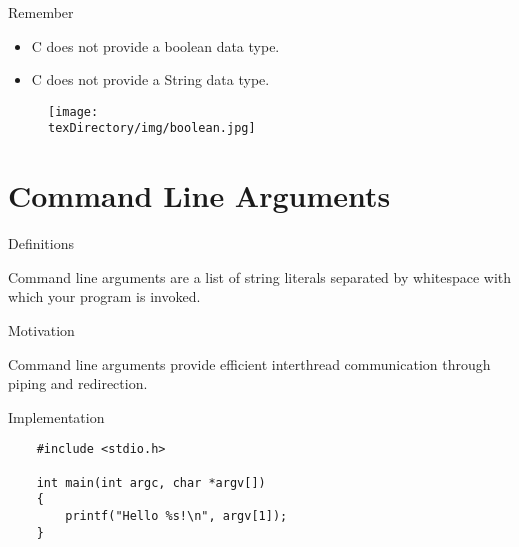\documentclass[compress]{beamer}
\begin{document}
\begin{slide}
	\begin{block}{Remember}

	\begin{itemize}
	\item[] C does not provide a boolean data type.
	\item[] C does not provide a String data type.
	\end{itemize}

	\end{block}
\end{slide}

\begin{slide}
	\begin{figure}
	\texttt{[image: \\texDirectory/img/boolean.jpg]}
	\end{figure}
\end{slide}

\section{Command Line Arguments}

\begin{slide}
	\begin{block}{Definitions}

	Command line arguments are a list of string literals separated by whitespace with which your program is invoked.

	\end{block}
\end{slide}

\begin{slide}
	\begin{block}{Motivation}
	
	Command line arguments provide efficient interthread communication through piping and redirection.

	\end{block}
\end{slide}

\begin{slide}
	\begin{block}{Implementation}

	\begin{verbatim}
	#include <stdio.h>

	int main(int argc, char *argv[])
	{
	    printf("Hello %s!\n", argv[1]);
	}
	\end{verbatim}

	\end{block}
\end{slide}
\end{document}
